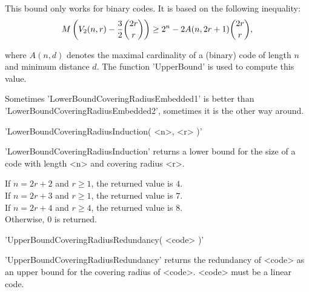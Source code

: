This bound only works for binary codes.
It is based on the following inequality:
\begin{equation}
    M \left( V_2(n,r) - \frac{3}{2} {{2r} \choose {r}} \right) \geq
    2^n - 2A( n, 2r+1 ) {{2r} \choose {r}},
\end{equation}

where $A(n,d)$ denotes the maximal cardinality of a (binary) code
of length $n$ and minimum distance $d$.
The function 'UpperBound' is used to compute this value.

Sometimes 'LowerBoundCoveringRadiusEmbedded1' is better than\\
'LowerBoundCoveringRadiusEmbedded2', sometimes it is the other
way around.




'LowerBoundCoveringRadiusInduction( <n>, <r> )'

'LowerBoundCoveringRadiusInduction' returns a lower bound
for the size of a code with length <n> and
covering radius <r>.

If $n = 2r+2$ and $r \geq 1$, the returned value is $4$.\\
If $n = 2r+3$ and $r \geq 1$, the returned value is $7$.\\
If $n = 2r+4$ and $r \geq 4$, the returned value is $8$.\\
Otherwise, $0$ is returned.




'UpperBoundCoveringRadiusRedundancy( <code> )'

'UpperBoundCoveringRadiusRedundancy' returns the redundancy of
<code> as an upper bound for the covering radius of <code>.
<code> must be a linear code.



